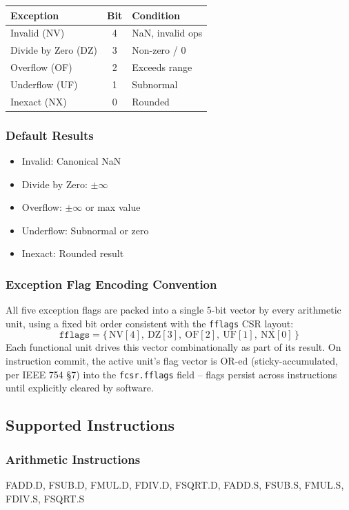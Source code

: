 \begin{table}[H]
\centering
\begin{tabular}{|l|c|l|}
\hline
\textbf{Exception} & \textbf{Bit} & \textbf{Condition} \\ \hline
Invalid (NV) & 4 & NaN, invalid ops \\ \hline
Divide by Zero (DZ) & 3 & Non-zero / 0 \\ \hline
Overflow (OF) & 2 & Exceeds range \\ \hline
Underflow (UF) & 1 & Subnormal \\ \hline
Inexact (NX) & 0 & Rounded \\ \hline
\end{tabular}
\end{table}

\subsubsection{Default Results}
\begin{itemize}
\item Invalid: Canonical NaN
\item Divide by Zero: $\pm \infty$
\item Overflow: $\pm \infty$ or max value
\item Underflow: Subnormal or zero
\item Inexact: Rounded result
\end{itemize}

\subsubsection{Exception Flag Encoding Convention}
All five exception flags are packed into a single 5-bit vector by every
arithmetic unit, using a fixed bit order consistent with the \texttt{fflags}
CSR layout:
\[
    \texttt{fflags} = \{\,\text{NV}[4],\ \text{DZ}[3],\ \text{OF}[2],\ \text{UF}[1],\ \text{NX}[0]\,\}
\]
Each functional unit drives this vector combinationally as part of its
result. On instruction commit, the active unit's flag vector is OR-ed
(sticky-accumulated, per IEEE 754 \S7) into the \texttt{fcsr.fflags} field --
flags persist across instructions until explicitly cleared by software.

\subsection{Supported Instructions}

\subsubsection{Arithmetic Instructions}
FADD.D, FSUB.D, FMUL.D, FDIV.D, FSQRT.D, FADD.S, FSUB.S, FMUL.S, FDIV.S, FSQRT.S


